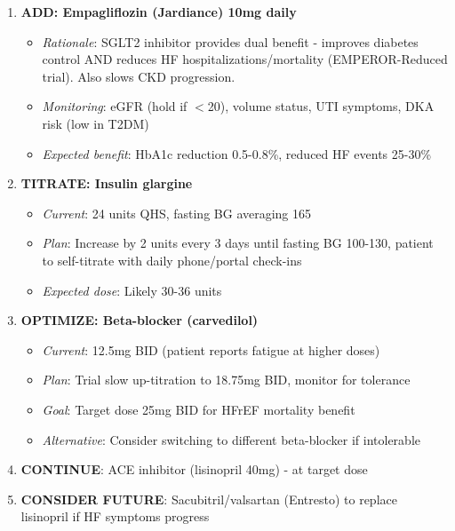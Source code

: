 \documentclass[11pt,letterpaper]{article}
\begin{document}
\begin{enumerate}[leftmargin=*]
    \item \textbf{ADD: Empagliflozin (Jardiance) 10mg daily}
    \begin{itemize}
        \item \textit{Rationale}: SGLT2 inhibitor provides dual benefit - improves diabetes control AND reduces HF hospitalizations/mortality (EMPEROR-Reduced trial). Also slows CKD progression.
        \item \textit{Monitoring}: eGFR (hold if $<$20), volume status, UTI symptoms, DKA risk (low in T2DM)
        \item \textit{Expected benefit}: HbA1c reduction 0.5-0.8\%, reduced HF events 25-30\%
    \end{itemize}

    \item \textbf{TITRATE: Insulin glargine}
    \begin{itemize}
        \item \textit{Current}: 24 units QHS, fasting BG averaging 165
        \item \textit{Plan}: Increase by 2 units every 3 days until fasting BG 100-130, patient to self-titrate with daily phone/portal check-ins
        \item \textit{Expected dose}: Likely 30-36 units
    \end{itemize}

    \item \textbf{OPTIMIZE: Beta-blocker (carvedilol)}
    \begin{itemize}
        \item \textit{Current}: 12.5mg BID (patient reports fatigue at higher doses)
        \item \textit{Plan}: Trial slow up-titration to 18.75mg BID, monitor for tolerance
        \item \textit{Goal}: Target dose 25mg BID for HFrEF mortality benefit
        \item \textit{Alternative}: Consider switching to different beta-blocker if intolerable
    \end{itemize}

    \item \textbf{CONTINUE}: ACE inhibitor (lisinopril 40mg) - at target dose

    \item \textbf{CONSIDER FUTURE}: Sacubitril/valsartan (Entresto) to replace lisinopril if HF symptoms progress
\end{enumerate}
\end{document}
